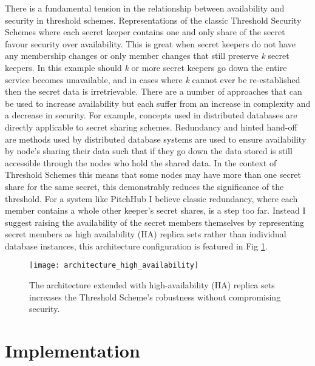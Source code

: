 There is a fundamental tension in the relationship between availability and security in threshold schemes. Representations of the classic Threshold Security Schemes where each secret keeper contains one and only share of the secret favour security over availability. This is great when secret keepers do not have any membership changes or only member changes that still preserve \textit{k} secret keepers. In this example should \textit{k} or more secret keepers go down the entire service becomes unavailable, and in cases where \textit{k} cannot ever be re-established then the secret data is irretrievable. There are a number of approaches that can be used to increase availability but each suffer from an increase in complexity and a decrease in security. For example, concepts used in distributed databases are directly applicable to secret sharing schemes. Redundancy and hinted hand-off are methods used by distributed database systems are used to ensure availability by node's sharing their data such that if they go down the data stored is still accessible through the nodes who hold the shared data. In the context of Threshold Schemes this means that some nodes may have more than one secret share for the same secret, this demonstrably reduces the significance of the threshold. For a system like PitchHub I believe classic redundancy, where each member contains a whole other keeper's secret shares, is a step too far. Instead I suggest raising the availability of the secret members themselves by representing secret members as high availability (HA) replica sets rather than individual database instances, this architecture configuration is featured in Fig \ref{fig:architecture_high_availability}.

\begin{figure}[ht]
    \centering
    \texttt{[image: architecture\_high\_availability]}
    \caption{The architecture extended with high-availability (HA) replica sets increases the Threshold Scheme's robustness without compromising security.}
    \label{fig:architecture_high_availability}
\end{figure}

\section{Implementation}


